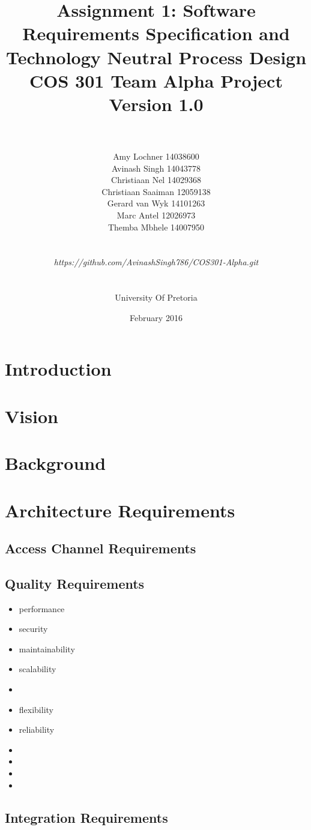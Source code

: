 \documentclass[a4paper]{article}
\title{\huge Assignment 1: Software Requirements Specification and Technology Neutral Process Design
\\COS 301 Team Alpha Project
\\Version 1.0}
\author{\\\\Amy Lochner 14038600\\ Avinash Singh 14043778 \\
Christiaan Nel 14029368\\ Christiaan Saaiman 12059138 \\
Gerard van Wyk 14101263\\ Marc Antel 12026973\\
Themba Mbhele 14007950
\\
\\
\\\textit{https://github.com/AvinashSingh786/COS301-Alpha.git}
\\
\\
\\ University Of Pretoria\\}
\date{February 2016}
\begin{document}
\maketitle
\newpage



\tableofcontents
\newpage

\section{Introduction}


\section{Vision}

\section{Background}
\section{Architecture Requirements}
\subsection{Access Channel Requirements}
\subsection{Quality Requirements}
\begin{itemize}
	\item performance
	\item security
	\item maintainability
	\item scalability
	\item 
	\item flexibility
	\item reliability
	\item 
	\item 
	\item 
	\item 
\end{itemize}

\subsection{Integration Requirements}
\end{document}
